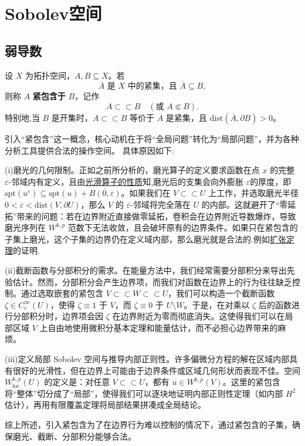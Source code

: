 \documentclass[../../main.tex]{subfiles}
\begin{document}
\section{Sobolev空间}\label{section:ch05-Sobolev空间}

\subsection{弱导数}\label{subsection:ch05-弱导数}

\begin{definition}
设 \(X\) 为拓扑空间，\(A,B\subseteq X\)。若
\[
\overline{A}\text{ 是 }X\text{ 中的紧集，且 }\overline{A}\subseteq B,
\]
则称 \(A\) \textbf{紧包含于} \(B\)，记作
\[
A\subset\subset B
\quad(\text{或 } A\Subset B).
\]
特别地,当 $B$ 是开集时，$A \subset\subset B$ 等价于 $\overline{A}$ 是紧集，且 $\mathrm{dist}(\overline{A}, \partial B) > 0$。
\end{definition}
\begin{remark}
引入“紧包含”这一概念，核心动机在于将“全局问题”转化为“局部问题”，并为各种分析工具提供合法的操作空间。
具体原因如下:

(i)磨光的几何限制。正如之前所分析的，磨光算子的定义要求函数在点 $x$ 的完整 $\varepsilon$-邻域内有定义，且由\hyperref[theorem:appC-光滑算子的性质]{光滑算子的性质}知,磨光后的支集会向外膨胀 $\varepsilon$的厚度，即 $\mathrm{spt}(u^\varepsilon) \subseteq \mathrm{spt}(u) + \overline{B(0,\varepsilon)}$。如果我们在 $V \subset\subset U$ 上工作，并选取磨光半径 $0 < \varepsilon < \mathrm{dist}(V, \partial U)$，那么 $V$ 的 $\varepsilon$-邻域将完全落在 $U$ 的内部。这就避开了“零延拓”带来的问题：若在边界附近直接做零延拓，卷积会在边界附近导数爆炸，导致磨光序列在 $W^{k,p}$ 范数下无法收敛，且会破坏原有的边界条件。如果只在紧包含的子集上磨光，这个子集的边界仍在定义域内部，那么磨光就是合法的.例如\hyperref[theorem:实值-Kirszbraun扩张定理]{扩张定理}的证明.

(ii)截断函数与分部积分的需求。在能量方法中，我们经常需要分部积分来导出先验估计。然而，分部积分会产生边界项，而我们对函数在边界上的行为往往缺乏控制。通过选取嵌套的紧包含 $V \subset\subset W \subset\subset U$，我们可以构造一个截断函数 $\zeta \in C_c^\infty(U)$，使得 $\zeta \equiv 1$ 于 $V$，而 $\zeta \equiv 0$ 于 $U \setminus W$。于是，在对乘以 $\zeta$ 后的函数进行分部积分时，边界项会因 $\zeta$ 在边界附近为零而彻底消失。这使得我们可以在局部区域 $V$ 上自由地使用微积分基本定理和能量估计，而不必担心边界带来的麻烦。

(iii)定义局部 Sobolev 空间与推导内部正则性。许多偏微分方程的解在区域内部具有很好的光滑性，但在边界上可能由于边界条件或区域几何形状而表现不佳。空间 $W_{\mathrm{loc}}^{k,p}(U)$ 的定义是：对任意 $V \subset\subset U$，都有 $u \in W^{k,p}(V)$。这里的紧包含将“整体”切分成了“局部”，使得我们可以逐块地证明内部正则性定理（如内部 $H^2$ 估计），再用有限覆盖定理将局部结果拼凑成全局结论。

综上所述，引入紧包含为了在边界行为难以控制的情况下，通过紧包含的子集，确保磨光、截断、分部积分能够合法。
\end{remark}
\end{document}
